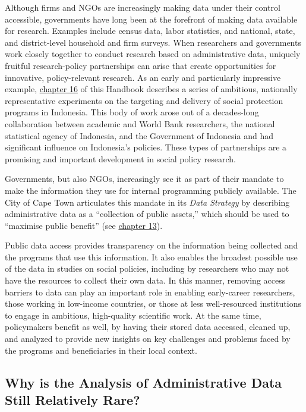 \documentclass[
]{WileySix}
\begin{document}
Although firms and NGOs are increasingly making data under their control accessible, governments have long been at the forefront of making data available for research. Examples include census data, labor statistics, and national, state, and district-level household and firm surveys. When researchers and governments work closely together to conduct research based on administrative data, uniquely fruitful research-policy partnerships can arise that create opportunities for innovative, policy-relevant research. As an early and particularly impressive example, \protect\hyperlink{indonesia}{chapter 16} of this Handbook describes a series of ambitious, nationally representative experiments on the targeting and delivery of social protection programs in Indonesia. This body of work arose out of a decades-long collaboration between academic and World Bank researchers, the national statistical agency of Indonesia, and the Government of Indonesia and had significant influence on Indonesia's policies. These types of partnerships are a promising and important development in social policy research.

Governments, but also NGOs, increasingly see it as part of their mandate to make the information they use for internal programming publicly available. The City of Cape Town articulates this mandate in its \emph{Data Strategy} by describing administrative data as a ``collection of public assets,'' which should be used to ``maximise public benefit'' (see \protect\hyperlink{cct}{chapter 13}).

Public data access provides transparency on the information being collected and the programs that use this information. It also enables the broadest possible use of the data in studies on social policies, including by researchers who may not have the resources to collect their own data. In this manner, removing access barriers to data can play an important role in enabling early-career researchers, those working in low-income countries, or those at less well-resourced institutions to engage in ambitious, high-quality scientific work. At the same time, policymakers benefit as well, by having their stored data accessed, cleaned up, and analyzed to provide new insights on key challenges and problems faced by the programs and beneficiaries in their local context.

\hypertarget{why-is-the-analysis-of-administrative-data-still-relatively-rare}{%
\subsection{Why is the Analysis of Administrative Data Still Relatively Rare?}\label{why-is-the-analysis-of-administrative-data-still-relatively-rare}}
\end{document}
